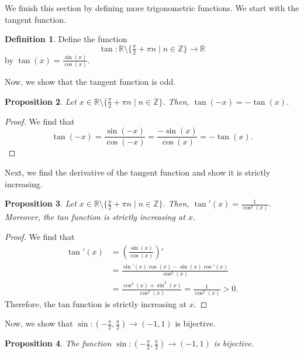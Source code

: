 \documentclass[a4paper, openany]{memoir}
\theoremstyle{definition}
\newtheorem{definition}{Definition}[section]
\theoremstyle{plain}
\newtheorem{proposition}[definition]{Proposition}
\begin{document}
We finish this section by defining more trigonometric functions. We start with the tangent function.
\begin{definition}
Define the function
\[\tan: \mathbb{R} \setminus \{\tfrac{\pi}{2} + \pi n \mid n \in \mathbb{Z}\} \to \mathbb{R}\]
by $\tan(x) = \frac{\sin(x)}{\cos(x)}$.
\end{definition}
\noindent Now, we show that the tangent function is odd.
\begin{proposition}
Let $x \in \mathbb{R} \setminus \{\tfrac{\pi}{2} + \pi n \mid n \in \mathbb{Z}\}$. Then, $\tan (-x) = -\tan (x)$.
\end{proposition}
\begin{proof}
We find that
\[\tan (-x) = \frac{\sin (-x)}{\cos (-x)} = \frac{-\sin (x)}{\cos (x)} = -\tan (x).\]
\end{proof}
\noindent Next, we find the derivative of the tangent function and show it is strictly increasing.
\begin{proposition}
Let $x \in \mathbb{R} \setminus \{\frac{\pi}{2} + \pi n \mid n \in \mathbb{Z}\}$. Then, $\tan'(x) = \frac{1}{\cos^2 (x)}$. Moreover, the tan function is strictly increasing at $x$.
\end{proposition}
\begin{proof}
We find that
\begin{align*}
    \tan'(x) &= \left(\frac{\sin (x)}{\cos (x)}\right)' \\
    &= \frac{\sin'(x) \cos (x) - \sin (x) \cos'(x)}{\cos^2 (x)} \\
    &= \frac{\cos^2 (x) + \sin^2 (x)}{\cos^2 (x)} = \frac{1}{\cos^2 (x)} > 0.
\end{align*}
Therefore, the tan function is strictly increasing at $x$.
\end{proof}
\noindent Now, we show that $\sin: (-\frac{\pi}{2}, \frac{\pi}{2}) \to (-1, 1)$ is bijective.
\begin{proposition}
The function $\sin: (-\frac{\pi}{2}, \frac{\pi}{2}) \to (-1, 1)$ is bijective.
\end{proposition}
\end{document}

